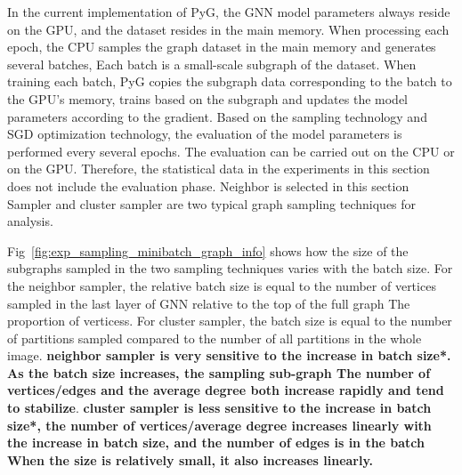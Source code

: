 In the current implementation of PyG, the GNN model parameters always reside on the GPU,
and the dataset resides in the main memory. When processing each epoch, the CPU samples
the graph dataset in the main memory and generates several batches,
Each batch is a small-scale subgraph of the dataset. When training each batch, 
PyG copies the subgraph data corresponding to the batch to the GPU's memory,
trains based on the subgraph and updates the model parameters according to the gradient.
Based on the sampling technology and SGD optimization technology, 
the evaluation of the model parameters is performed every several epochs. 
The evaluation can be carried out on the CPU or on the GPU. 
Therefore, the statistical data in the experiments in this section does not include the evaluation phase. 
Neighbor is selected in this section Sampler and cluster sampler are two typical graph sampling techniques for analysis.

Fig~\ref{fig:exp_sampling_minibatch_graph_info} shows how the size of the subgraphs sampled in the two sampling techniques varies with the batch size.
For the neighbor sampler, the relative batch size is equal to the number of vertices sampled in the last layer of GNN relative to the top of the full graph The proportion of verticess.
For cluster sampler, the batch size is equal to the number of partitions sampled compared to the number of all partitions in the whole image.
\textbf{neighbor sampler is very sensitive to the increase in batch size*. As the batch size increases, 
the sampling sub-graph The number of vertices/edges and the average degree both increase rapidly and tend to stabilize}.
\textbf{cluster sampler is less sensitive to the increase in batch size*, the number of vertices/average degree increases
linearly with the increase in batch size, and the number of edges is in the batch When the size is relatively small,
it also increases linearly.}

